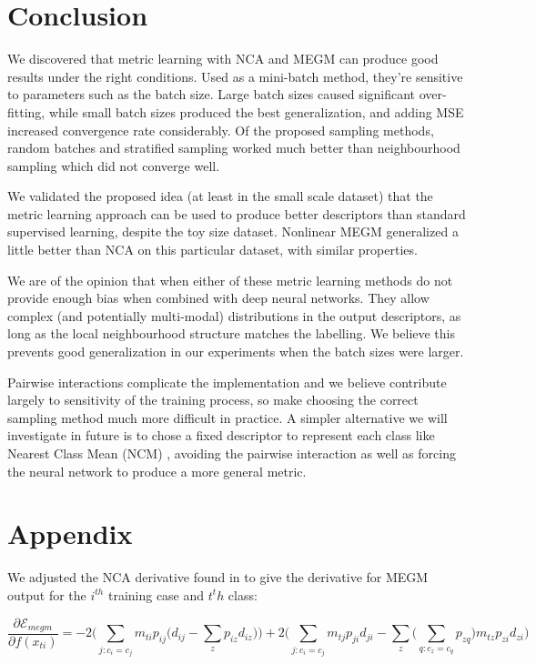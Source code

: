 \section {Conclusion}

We discovered that metric learning with \gls{NCA} and \gls{MEGM} can produce good results under the right conditions. Used as a mini-batch method, they're sensitive to parameters such as the batch size. Large batch sizes caused significant over-fitting,
while small batch sizes produced the best generalization, and adding \gls{MSE} increased convergence rate considerably. Of the proposed sampling methods, random batches and stratified sampling worked much better than neighbourhood sampling which did not converge well.


We validated the proposed idea (at least in the small scale dataset) that
the metric learning approach can be used to produce better descriptors than
standard supervised learning, despite the toy size dataset. Nonlinear MEGM
generalized a little better than NCA on this particular dataset, with similar
properties.

We are of the opinion that when either of these metric learning methods do
not provide enough bias when combined with deep neural networks. They allow
complex (and potentially multi-modal) distributions in the output descriptors,
as long as the local neighbourhood structure matches the labelling. We believe
this prevents good generalization in our experiments when the batch sizes were
larger.

Pairwise interactions complicate the implementation and we believe contribute largely to sensitivity of the training process, so make choosing the correct
sampling method much more difficult in practice. A simpler alternative we will
investigate in future is to chose a fixed descriptor to represent each class like
Nearest Class Mean (NCM) \cite {Mensink2012a}, avoiding the pairwise interaction
as well as forcing the neural network to produce a more general metric.



\section{Appendix}
\label{sec:appendix}


 We adjusted the \gls{NCA} derivative found in \cite {Salakhutdinov2007a} to give the derivative for \gls{MEGM} output for the $ i^{th} $ training case and $ t^th $ class:


\begin{equation}
\label{eq:megm_grad}
\frac{\partial \mathcal{E}_{megm}}{\partial f(x_{ti})} = 
  -2 \bigg( \sum_{j:c_i = c_j}  m_{ti} {p_{ij} \Big( d_{ij} - \sum_z{p_{iz}d_{iz}} \Big) } \bigg) 
  +2 \bigg( \sum_{j:c_i = c_j} m_{tj}{p_{ji}d_{ji} - \sum_z{\Big( \sum_{q:c_z = c_q}{p_{zq}} \Big) m_{tz}p_{zi}d_{zi}   }} \bigg)
\end{equation}

